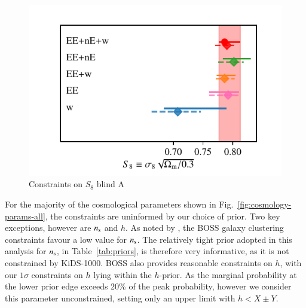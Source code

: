 \begin{figure}
	\begin{center}
		\includegraphics[width=\columnwidth]{Parameter_Plots/S8_comparison_blindA}
		\caption{Constraints on $S_{8}$ blind A}
		\label{fig:S8comp}
	\end{center}
\end{figure}

For the majority of the cosmological parameters shown in Fig.~\ref{fig:cosmology-params-all}, the constraints are uninformed by our choice of prior.  Two key exceptions, however are $n_{\rm s}$ and $h$.  As noted by \citet{troester/etal:2020}, the BOSS galaxy clustering constraints favour a low value for $n_{\rm s}$.   The relatively tight prior adopted in this analysis for $n_{\rm s}$, in Table~\ref{tab:priors}, is therefore very informative, as it is not constrained by KiDS-1000.   BOSS also provides reasonable constraints on $h$, with our $1\sigma$ constraints on $h$ lying within the $h$-prior.   As the marginal probability at the lower prior edge exceeds 20\% of the peak probability, however we consider this parameter unconstrained, setting only an upper limit with $h < X \pm Y$.

